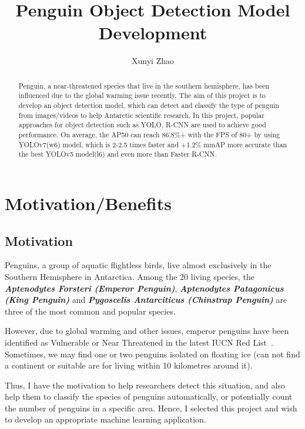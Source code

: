 \documentclass[runningheads]{llncs}
\begin{document}
%
\title{Penguin Object Detection Model Development}

\author{Xunyi Zhao}
%
\maketitle
%
\begin{abstract}
Penguin, a near-threatened species that live in the southern hemisphere, has been influenced due to the global warming issue recently. The aim of this project is to develop an object detection model, which can detect and classify the type of penguin from images/videos to help Antarctic scientific research. In this project, popular approaches for object detection such as YOLO, R-CNN are used to achieve good performance. On average, the AP50 can reach 86.8\%+ with the FPS of 80+ by using YOLOv7(w6) model, which is 2-2.5 times faster and +1.2\% mmAP more accurate than the best YOLOv5 model(l6) and even more than Faster R-CNN.

\end{abstract}
%
%

\section{Motivation/Benefits}
\subsection{Motivation}
Penguins, a group of aquatic flightless birds, live almost exclusively in the Southern Hemisphere in Antarctica. Among the 20 living species, the \textbf{\textit{Aptenodytes Forsteri (Emperor Penguin)}}, \textbf{\textit{Aptenodytes Patagonicus (King Penguin)}} and \textbf{\textit{Pygoscelis Antarciticus (Chinstrap Penguin)}} are three of the most common and popular species. 

However, due to global warming and other issues, emperor penguins have been identified as Vulnerable or Near Threatened in the latest IUCN Red List~\cite{ref_red_list}. Sometimes, we may find one or two penguins isolated on floating ice (can not find a continent or suitable are for living within 10 kilometres around it).

Thus, I have the motivation to help researchers detect this situation, and also help them to classify the species of penguins automatically, or potentially count the number of penguins in a specific area. Hence, I selected this project and wish to develop an appropriate machine learning application.
\end{document}

